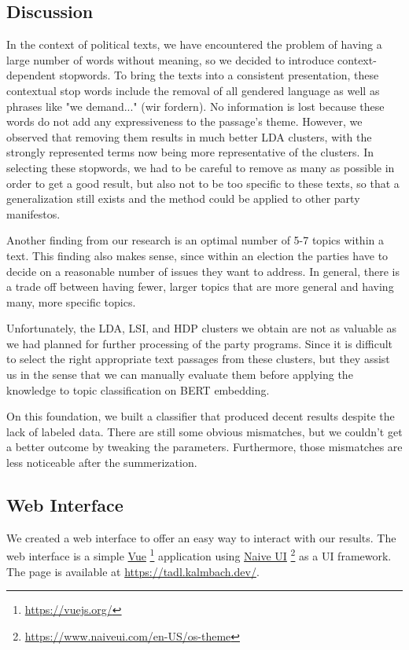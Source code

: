 \subsection{Discussion}
In the context of political texts, we have encountered the problem of having a large number of words without meaning, so we decided to introduce context-dependent stopwords.
To bring the texts into a consistent presentation, these contextual stop words include the removal of all gendered language as well as phrases like "we demand..." (wir fordern). No information is lost because these words do not add any expressiveness to the passage's theme. However, we observed that removing them results in much better LDA clusters, with the strongly represented terms now being more representative of the clusters.
In selecting these stopwords, we had to be careful to remove as many as possible in order to get a good result, but also not to be too specific to these texts, so that a generalization still exists and the method could be applied to other party manifestos.

Another finding from our research is an optimal number of 5-7 topics within a text. This finding also makes sense, since within an election the parties have to decide on a reasonable number of issues they want to address. In general, there is a trade off between having fewer, larger topics that are more general and having many, more specific topics.

Unfortunately, the LDA, LSI, and HDP clusters we obtain are not as valuable as we had planned for further processing of the party programs. Since it is difficult to select the right appropriate text passages from these clusters, but they assist us in the sense that we can manually evaluate them before applying the knowledge to topic classification on BERT embedding.

On this foundation, we built a classifier that produced decent results despite the lack of labeled data. There are still some obvious mismatches, but we couldn't get a better outcome by tweaking the parameters. Furthermore, those mismatches are less noticeable after the summerization.


\subsection{Web Interface}
We created a web interface to offer an easy way to interact with our results.
The web interface is a simple \href{https://vuejs.org/}{Vue} \footnote{\url{https://vuejs.org/}} application using \href{https://www.naiveui.com/en-US/os-theme}{Naive UI} \footnote{\url{https://www.naiveui.com/en-US/os-theme}} as a UI framework. The page is available at \href{https://tadl.kalmbach.dev/}{https://tadl.kalmbach.dev/}.

